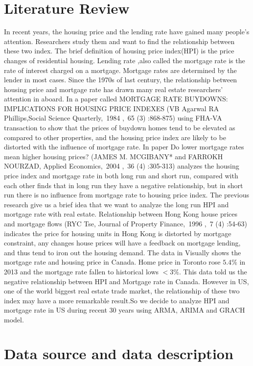 \documentclass[12pt,letterpaper]{article}
\begin{document}
\section{Literature Review}
In recent years, the housing price and the lending rate have gained many people’s attention. Researchers study them and want to find the relationship between these two index.
The brief definition of housing price index(HPI) is the price changes of residential housing. Lending rate ,also called the mortgage rate is the rate of interest charged on a mortgage. Mortgage rates are determined by the lender in most cases.
Since the 1970s of last century, the relationship between housing price and mortgage rate has drawn many real estate researchers’ attention in aboard. In a paper called MORTGAGE RATE BUYDOWNS: IMPLICATIONS FOR HOUSING PRICE INDEXES (VB Agarwal RA Phillips,Social Science Quarterly, 1984 , 65 (3) :868-875) using FHA-VA transaction to show that the prices of buydown homes tend to be elevated as compared to other properties, and the housing price index are likely to be distorted with the influence of mortgage rate. 
In paper Do lower mortgage rates mean higher housing prices? (JAMES M. MCGIBANY* and FARROKH NOURZAD, Applied Economics, 2004 , 36 (4) :305-313) analyzes the housing price index and mortgage rate in both long run and short run, compared with each other finds that in long run they have a negative relationship, but in short run there is no influence from mortgage rate to housing price index. 
The previous research give us a brief idea that we want to analyze the long run HPI and mortgage rate with real estate.
Relationship between Hong Kong house prices and mortgage flows (RYC Tse, Journal of Property Finance, 1996 , 7 (4) :54-63)  indicates the price for housing units in Hong Kong is distorted by mortgage constraint, any changes house prices will have a feedback on mortgage lending, and thus tend to iron out the housing demand. 
The data in Visually shows the mortgage rate and housing price in Canada. Home price in Toronto rose $5.4\%$ in 2013 and the mortgage rate fallen to historical lows $<3\%$. This data told us the negative relationship between HPI and Mortgage rate in Canada.
However in US, one of the world biggest real estate trade market, the relationship of these two index may have a more remarkable result.So we decide to analyze HPI and mortgage rate in US during recent 30 years using ARMA, ARIMA and GRACH model.


\section{Data source and data description}
\end{document}
